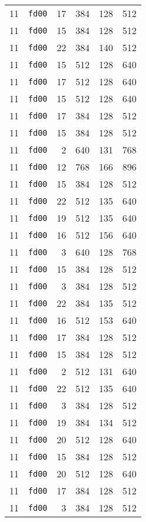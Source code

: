 \documentclass{article}
\begin{document}
\begin{table}[h!]
\begin{tabular}{llrrrl}
    11 & \texttt{fd00} & 17 & 384 & 128 & 512 \\
    11 & \texttt{fd00} & 15 & 384 & 128 & 512 \\
    11 & \texttt{fd00} & 22 & 384 & 140 & 512 \\
    11 & \texttt{fd00} & 15 & 512 & 128 & 640 \\
    11 & \texttt{fd00} & 17 & 512 & 128 & 640 \\
    11 & \texttt{fd00} & 15 & 512 & 128 & 640 \\
    11 & \texttt{fd00} & 17 & 384 & 128 & 512 \\
    11 & \texttt{fd00} & 15 & 384 & 128 & 512 \\
    11 & \texttt{fd00} & 2 & 640 & 131 & 768 \\
    11 & \texttt{fd00} & 12 & 768 & 166 & 896 \\
    11 & \texttt{fd00} & 15 & 384 & 128 & 512 \\
    11 & \texttt{fd00} & 22 & 512 & 135 & 640 \\
    11 & \texttt{fd00} & 19 & 512 & 135 & 640 \\
    11 & \texttt{fd00} & 16 & 512 & 156 & 640 \\
    11 & \texttt{fd00} & 3 & 640 & 128 & 768 \\
    11 & \texttt{fd00} & 15 & 384 & 128 & 512 \\
    11 & \texttt{fd00} & 3 & 384 & 128 & 512 \\
    11 & \texttt{fd00} & 22 & 384 & 135 & 512 \\
    11 & \texttt{fd00} & 16 & 512 & 153 & 640 \\
    11 & \texttt{fd00} & 17 & 384 & 128 & 512 \\
    11 & \texttt{fd00} & 15 & 384 & 128 & 512 \\
    11 & \texttt{fd00} & 2 & 512 & 131 & 640 \\
    11 & \texttt{fd00} & 22 & 512 & 135 & 640 \\
    11 & \texttt{fd00} & 3 & 384 & 128 & 512 \\
    11 & \texttt{fd00} & 19 & 384 & 134 & 512 \\
    11 & \texttt{fd00} & 20 & 512 & 128 & 640 \\
    11 & \texttt{fd00} & 15 & 384 & 128 & 512 \\
    11 & \texttt{fd00} & 20 & 512 & 128 & 640 \\
    11 & \texttt{fd00} & 17 & 384 & 128 & 512 \\
    11 & \texttt{fd00} & 3 & 384 & 128 & 512 \\

\end{tabular}
\end{table}
\end{document}
